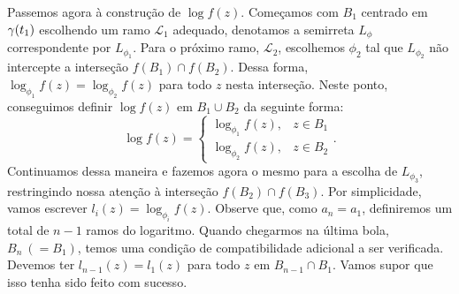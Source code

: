     Passemos agora à construção de $\log f(z)$. Começamos com $B_1$ centrado em $\gamma(t_1)$
    escolhendo um ramo $\mathcal{L}_1$ adequado, denotamos a semirreta $L_\phi$ correspondente por
    $L_{\phi_1}$. Para o próximo ramo, $\mathcal{L}_2$, escolhemos $\phi_2$ tal que $L_{\phi_2}$
    não intercepte a interseção $f(B_1) \cap f(B_2)$. Dessa forma, 
    $\log_{\phi_1} f(z) = \log_{\phi_2} f(z)$ para todo $z$ nesta interseção. 
    Neste ponto, conseguimos definir $\log f(z)$ em $B_1 \cup B_2$ da seguinte forma:
    \begin{equation*}
        \log f(z) =
        \begin{cases}
            \log_{\phi_1} f(z), & z \in B_1 \\
            \log_{\phi_2} f(z), & z \in B_2
        \end{cases}
        .
    \end{equation*}
    Continuamos dessa maneira e fazemos agora o mesmo para a escolha de $L_{\phi_3}$, 
    restringindo nossa atenção à interseção $f(B_2) \cap f(B_3)$. Por simplicidade, 
    vamos escrever $l_i(z) =  \log_{\phi_i} f(z)$. Observe que, como $a_n = a_1$, 
    definiremos um total de $n-1$ ramos do logaritmo. Quando chegarmos na última bola, 
    $B_n \ (= B_1)$, temos uma condição de compatibilidade adicional a ser verificada. 
    Devemos ter $l_{n-1}(z) = l_1(z)$ para todo $z$ em $B_{n-1} \cap B_1$. Vamos supor que isso
    tenha sido feito com sucesso.
    
